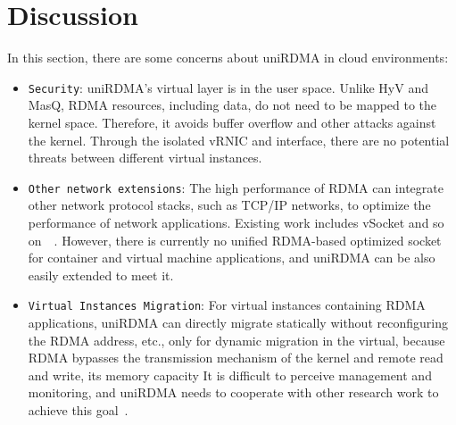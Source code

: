 
\section{Discussion}
In this section, there are some concerns about uniRDMA in cloud environments:
\begin{itemize}
\item {\verb|Security|}: uniRDMA's virtual layer is in the user space. Unlike HyV and MasQ, RDMA resources, including data, do not need to be mapped to the kernel space. Therefore, it avoids buffer overflow and other attacks against the kernel. Through the isolated vRNIC and interface, there are no potential threats between different virtual instances.
\item {\verb|Other network extensions|}: The high performance of RDMA can integrate other network protocol stacks, such as TCP/IP networks, to optimize the performance of network applications. Existing work includes vSocket and so on~\cite{wang2019vsocket}~\cite{li2019socksdirect}. However, there is currently no unified RDMA-based optimized socket for container and virtual machine applications, and uniRDMA can be also easily extended to meet it.
\item {\verb|Virtual Instances Migration|}: For virtual instances containing RDMA applications, uniRDMA can directly migrate statically without reconfiguring the RDMA address, etc., only for dynamic migration in the virtual, because RDMA bypasses the transmission mechanism of the kernel and remote read and write, its memory capacity It is difficult to perceive management and monitoring, and uniRDMA needs to cooperate with other research work to achieve this goal~\cite{firestone2018accelnsdi}.
\end{itemize}
